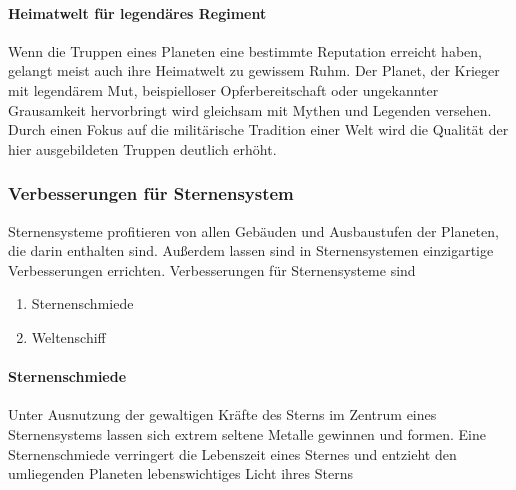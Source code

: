 \documentclass[11pt, a4paper]{article}
\begin{document}
\paragraph{Heimatwelt für legendäres Regiment}
Wenn die Truppen eines Planeten eine bestimmte Reputation erreicht haben, gelangt meist auch ihre Heimatwelt
zu gewissem Ruhm. Der Planet, der Krieger mit legendärem Mut, beispielloser Opferbereitschaft oder ungekannter
Grausamkeit hervorbringt wird gleichsam mit Mythen und Legenden versehen. Durch einen Fokus auf die 
militärische Tradition einer Welt wird die Qualität der hier ausgebildeten Truppen deutlich erhöht.
%
\subsubsection{Verbesserungen für Sternensystem}
Sternensysteme profitieren von allen Gebäuden und Ausbaustufen der Planeten, die darin enthalten sind.
Außerdem lassen sind in Sternensystemen einzigartige Verbesserungen errichten. 
Verbesserungen für Sternensysteme sind
\begin{enumerate}
    \item Sternenschmiede
    \item Weltenschiff
\end{enumerate}
%
\paragraph{Sternenschmiede}
Unter Ausnutzung der gewaltigen Kräfte des Sterns im Zentrum eines Sternensystems lassen sich extrem seltene
Metalle gewinnen und formen. Eine Sternenschmiede verringert die Lebenszeit eines Sternes und entzieht den 
umliegenden Planeten lebenswichtiges Licht ihres Sterns
%
\end{document}
